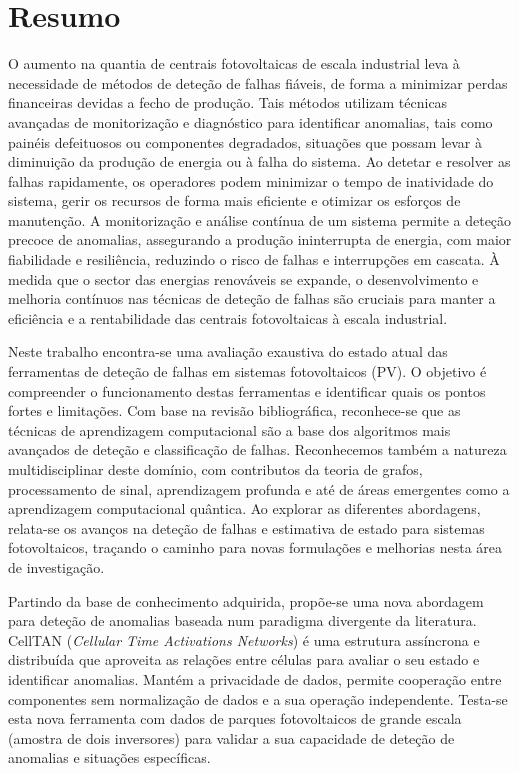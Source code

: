 \chapter*{Resumo}

O aumento na quantia de centrais fotovoltaicas de escala industrial leva à necessidade de métodos de deteção de falhas fiáveis, de forma a minimizar perdas financeiras devidas a fecho de produção. Tais métodos utilizam técnicas avançadas de monitorização e diagnóstico para identificar anomalias, tais como painéis defeituosos ou componentes degradados, situações que possam levar à diminuição da produção de energia ou à falha do sistema. Ao detetar e resolver as falhas rapidamente, os operadores podem minimizar o tempo de inatividade do sistema, gerir os recursos de forma mais eficiente e otimizar os esforços de manutenção. A monitorização e análise contínua de um sistema permite a deteção precoce de anomalias, assegurando a produção ininterrupta de energia, com maior fiabilidade e resiliência, reduzindo o risco de falhas e interrupções em cascata. À medida que o sector das energias renováveis se expande, o desenvolvimento e melhoria contínuos nas técnicas de deteção de falhas são cruciais para manter a eficiência e a rentabilidade das centrais fotovoltaicas à escala industrial.

Neste trabalho encontra-se uma avaliação exaustiva do estado atual das ferramentas de deteção de falhas em sistemas fotovoltaicos (PV). O objetivo é compreender o funcionamento destas ferramentas e identificar quais os pontos fortes e limitações. Com base na revisão bibliográfica, reconhece-se que as técnicas de aprendizagem computacional são a base dos algoritmos mais avançados de deteção e classificação de falhas. Reconhecemos também a natureza multidisciplinar deste domínio, com contributos da teoria de grafos, processamento de sinal, aprendizagem profunda e até de áreas emergentes como a aprendizagem computacional quântica. Ao explorar as diferentes abordagens, relata-se os avanços na deteção de falhas e estimativa de estado para sistemas fotovoltaicos, traçando o caminho para novas formulações e melhorias nesta área de investigação.

Partindo da base de conhecimento adquirida, propõe-se uma nova abordagem para deteção de anomalias baseada num paradigma divergente da literatura. CellTAN (\textit{Cellular Time Activations Networks}) é uma estrutura assíncrona e distribuída que aproveita as relações entre células para avaliar o seu estado e identificar anomalias. Mantém a privacidade de dados, permite cooperação entre componentes sem normalização de dados e a sua operação independente.
Testa-se esta nova ferramenta com dados de parques fotovoltaicos de grande escala (amostra de dois inversores) para validar a sua capacidade de deteção de anomalias e situações específicas.

